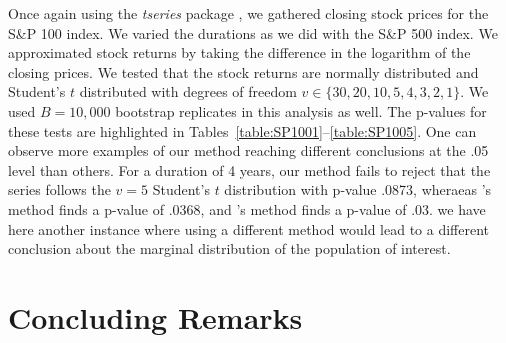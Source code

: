 \documentclass[12pt, titlepage, letterpaper]{article}
\begin{document}
{Once again using the \textsl{tseries} package 
\citep{tseries}, 
we gathered closing stock prices for the S\&P 100 index. We varied the
durations as we did with the S\&P 500 index.
We approximated stock returns by taking the difference in the logarithm 
of the closing prices.
We tested that the stock returns are normally
distributed and Student's $t$ distributed 
with degrees of freedom $v \in \{30, 20, 10, 5, 4, 3, 2, 1\}$. 
We used $B = 10,000$ bootstrap 
replicates in this analysis as well.
The p-values for these tests are highlighted in 
Tables~\ref{table:SP1001}--\ref{table:SP1005}. One can observe more examples
of our method reaching different conclusions at the .05 level than others.
For a duration of 4 years, our method fails to reject that
the series follows the $v = 5$ Student's $t$ distribution with p-value .0873,
wheraeas \citep{babu2004goodness}'s method finds a p-value of .0368, and 
\citet{zeimbekakis2022misuses}'s method finds a p-value of .03. we have here
another instance where using a different method would lead to a different
conclusion about the marginal distribution of the population of interest.











\section{Concluding Remarks}
\label{sec:conclusion}

}
\end{document}
